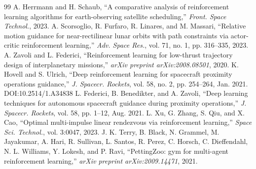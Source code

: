 \documentclass[paper]{ieice}
\begin{document}
\begin{thebibliography}{99}
A. Herrmann and H. Schaub, ``A comparative analysis of reinforcement learning algorithms for earth-observing satellite scheduling,'' \textit{Front. Space Technol.}, 2023. %
A. Scorsoglio, R. Furfaro, R. Linares, and M. Massari, ``Relative motion guidance for near-rectilinear lunar orbits with path constraints via actor-critic reinforcement learning,'' \textit{Adv. Space Res.}, vol. 71, no. 1, pp. 316--335, 2023. %
A. Zavoli and L. Federici, ``Reinforcement learning for low-thrust trajectory design of interplanetary missions,'' \textit{arXiv preprint arXiv:2008.08501}, 2020.
K. Hovell and S. Ulrich, ``Deep reinforcement learning for spacecraft proximity operations guidance,'' \textit{J. Spacecr. Rockets}, vol. 58, no. 2, pp. 254--264, Jan. 2021. DOI:10.2514/1.A34838
L. Federici, B. Benedikter, and A. Zavoli, ``Deep learning techniques for autonomous spacecraft guidance during proximity operations,'' \textit{J. Spacecr. Rockets}, vol. 58, pp. 1--12, Aug. 2021. %
L. Xu, G. Zhang, S. Qiu, and X. Cao, ``Optimal multi-impulse linear rendezvous via reinforcement learning,'' \textit{Space Sci. Technol.}, vol. 3:0047, 2023. %
J. K. Terry, B. Black, N. Grammel, M. Jayakumar, A. Hari, R. Sullivan, L. Santos, R. Perez, C. Horsch, C. Dieffendahl, N. L. Williams, Y. Lokesh, and P. Ravi, ``PettingZoo: gym for multi-agent reinforcement learning,'' \textit{arXiv preprint arXiv:2009.14471}, 2021.





\end{thebibliography}
\end{document}
